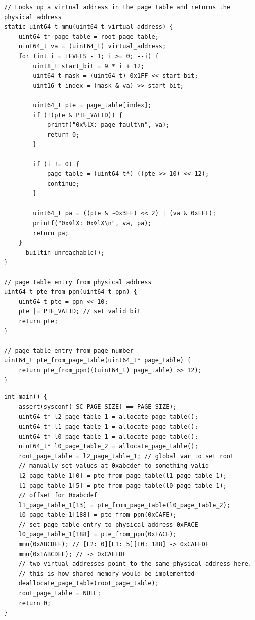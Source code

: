 \documentclass[../notes.tex]{subfiles}
\begin{document}
\begin{listing}[H]
\begin{verbatim}
// Looks up a virtual address in the page table and returns the physical address
static uint64_t mmu(uint64_t virtual_address) {
    uint64_t* page_table = root_page_table;
    uint64_t va = (uint64_t) virtual_address;
    for (int i = LEVELS - 1; i >= 0; --i) {
        uint8_t start_bit = 9 * i + 12;
        uint64_t mask = (uint64_t) 0x1FF << start_bit;
        uint16_t index = (mask & va) >> start_bit;

        uint64_t pte = page_table[index];
        if (!(pte & PTE_VALID)) {
            printf("0x%lX: page fault\n", va);
            return 0;
        }

        if (i != 0) {
            page_table = (uint64_t*) ((pte >> 10) << 12);
            continue;
        }

        uint64_t pa = ((pte & ~0x3FF) << 2) | (va & 0xFFF);
        printf("0x%lX: 0x%lX\n", va, pa);
        return pa;
    }
    __builtin_unreachable();
}

// page table entry from physical address
uint64_t pte_from_ppn(uint64_t ppn) {
    uint64_t pte = ppn << 10;
    pte |= PTE_VALID; // set valid bit
    return pte;
}

// page table entry from page number
uint64_t pte_from_page_table(uint64_t* page_table) {
    return pte_from_ppn(((uint64_t) page_table) >> 12);
}
\end{verbatim}
\end{listing}


\begin{listing}[H]
\begin{verbatim}
int main() {
    assert(sysconf(_SC_PAGE_SIZE) == PAGE_SIZE);
    uint64_t* l2_page_table_1 = allocate_page_table();
    uint64_t* l1_page_table_1 = allocate_page_table();
    uint64_t* l0_page_table_1 = allocate_page_table();
    uint64_t* l0_page_table_2 = allocate_page_table();
    root_page_table = l2_page_table_1; // global var to set root
    // manually set values at 0xabcdef to something valid
    l2_page_table_1[0] = pte_from_page_table(l1_page_table_1);
    l1_page_table_1[5] = pte_from_page_table(l0_page_table_1);
    // offset for 0xabcdef
    l1_page_table_1[13] = pte_from_page_table(l0_page_table_2);
    l0_page_table_1[188] = pte_from_ppn(0xCAFE);
    // set page table entry to physical address 0xFACE
    l0_page_table_1[188] = pte_from_ppn(0xFACE);
    mmu(0xABCDEF); // [L2: 0][L1: 5][L0: 188] -> 0xCAFEDF
    mmu(0x1ABCDEF); // -> OxCAFEDF
    // two virtual addresses point to the same physical address here.
    // this is how shared memory would be implemented
    deallocate_page_table(root_page_table);
    root_page_table = NULL;
    return 0;
}
\end{verbatim}
\end{listing}
\end{document}
